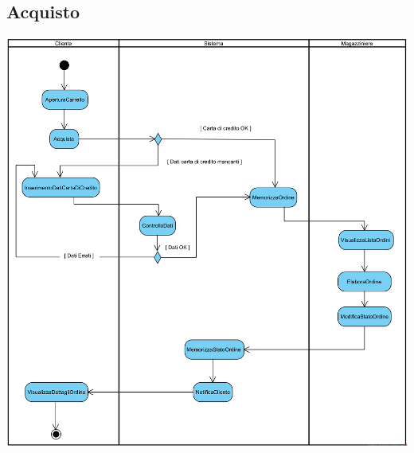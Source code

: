 \documentclass[12pt]{article}
\begin{document}
\subsection{Acquisto}
\begin{center}
\includegraphics[width=\textwidth]{ActivityDiagram/ClienteAcquistoArticolo}
\end{center}
\end{document}
